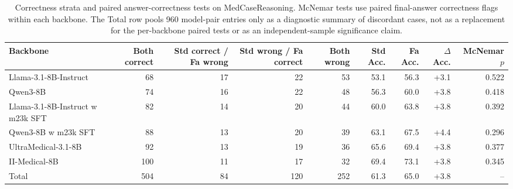 \documentclass[a4paper,fleqn,doubleblind]{cas-sc}
\begin{document}
\begin{table}[htbp]
    \centering
    \scriptsize
    \setlength{\tabcolsep}{3.5pt}
    \caption{Correctness strata and paired answer-correctness tests on MedCaseReasoning. McNemar tests use paired final-answer correctness flags within each backbone. The Total row pools 960 model-pair entries only as a diagnostic summary of discordant cases, not as a replacement for the per-backbone paired tests or as an independent-sample significance claim.}
    \label{tab:correctness_strata_counts}
    \begin{adjustbox}{max width=\textwidth}
    \begin{tabular}{lrrrrrrrr}
        \toprule
        \textbf{Backbone} & \textbf{Both correct} & \textbf{Std correct / Fa wrong} & \textbf{Std wrong / Fa correct} & \textbf{Both wrong} & \textbf{Std Acc.} & \textbf{Fa Acc.} & \textbf{$\Delta$ Acc.} & \textbf{McNemar $p$} \\
        \midrule
        Llama-3.1-8B-Instruct & 68 & 17 & 22 & 53 & 53.1 & 56.3 & +3.1 & 0.522 \\
        Qwen3-8B & 74 & 16 & 22 & 48 & 56.3 & 60.0 & +3.8 & 0.418 \\
        Llama-3.1-8B-Instruct w m23k SFT & 82 & 14 & 20 & 44 & 60.0 & 63.8 & +3.8 & 0.392 \\
        Qwen3-8B w m23k SFT & 88 & 13 & 20 & 39 & 63.1 & 67.5 & +4.4 & 0.296 \\
        UltraMedical-3.1-8B & 92 & 13 & 19 & 36 & 65.6 & 69.4 & +3.8 & 0.377 \\
        II-Medical-8B & 100 & 11 & 17 & 32 & 69.4 & 73.1 & +3.8 & 0.345 \\
        \midrule
        Total & 504 & 84 & 120 & 252 & 61.3 & 65.0 & +3.8 & -- \\
        \bottomrule
    \end{tabular}
    \end{adjustbox}
\end{table}
\end{document}
